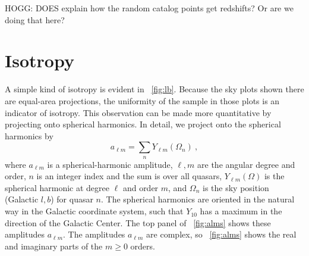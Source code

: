 \documentclass[modern]{aastex631}
\newcommand{\figref}[1]{\figurename~\ref{#1}}
\begin{document}
HOGG: DOES \cite{ksf} explain how the random catalog points get redshifts? Or are we doing that here?

\section{Isotropy}\label{sec:iso}

A simple kind of isotropy is evident in \figref{fig:lb}.
Because the sky plots shown there are equal-area projections, the uniformity of the sample in those plots is an indicator of isotropy.
This observation can be made more quantitative by projecting onto spherical harmonics.
In detail, we project onto the spherical harmonics by
\begin{equation}\label{eq:alms}
    a_{\ell m} = \sum_n Y_{\ell m}(\Omega_n) ~,
\end{equation}
where $a_{\ell m}$ is a spherical-harmonic amplitude,
$\ell, m$ are the angular degree and order,
$n$ is an integer index and the sum is over all quasars,
$Y_{\ell m}(\Omega)$ is the spherical harmonic at degree $\ell$ and order $m$,
and
$\Omega_n$ is the sky position (Galactic $l, b$) for quasar $n$.
The spherical harmonics are oriented in the natural way in the Galactic coordinate system, such that $Y_{10}$ has a maximum in the direction of the Galactic Center.
The top panel of \figref{fig:alms} shows these amplitudes $a_{\ell m}$.
The amplitudes $a_{\ell m}$ are complex, so \figref{fig:alms} shows the real and imaginary parts of the $m\geq 0$ orders.
\end{document}
